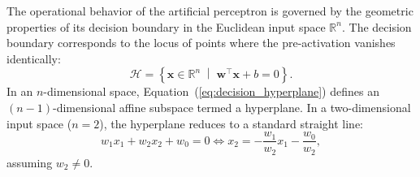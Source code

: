 \documentclass[../../../main.tex]{subfiles}
\begin{document}
The operational behavior of the artificial perceptron is governed by the geometric properties of its decision boundary in the Euclidean input space $\mathbb{R}^n$. The decision boundary corresponds to the locus of points where the pre-activation vanishes identically:
\begin{equation}
\mathcal{H} = \left\{ \mathbf{x} \in \mathbb{R}^n \;\middle|\; \mathbf{w}^\top \mathbf{x} + b = 0 \right\}.
\label{eq:decision_hyperplane}
\end{equation}
In an $n$-dimensional space, Equation~(\ref{eq:decision_hyperplane}) defines an $(n-1)$-dimensional affine subspace termed a hyperplane. In a two-dimensional input space ($n = 2$), the hyperplane reduces to a standard straight line:
\begin{equation}
w_1 x_1 + w_2 x_2 + w_0 = 0 \iff x_2 = -\frac{w_1}{w_2} x_1 - \frac{w_0}{w_2},
\end{equation}
assuming $w_2 \neq 0$.
\end{document}
